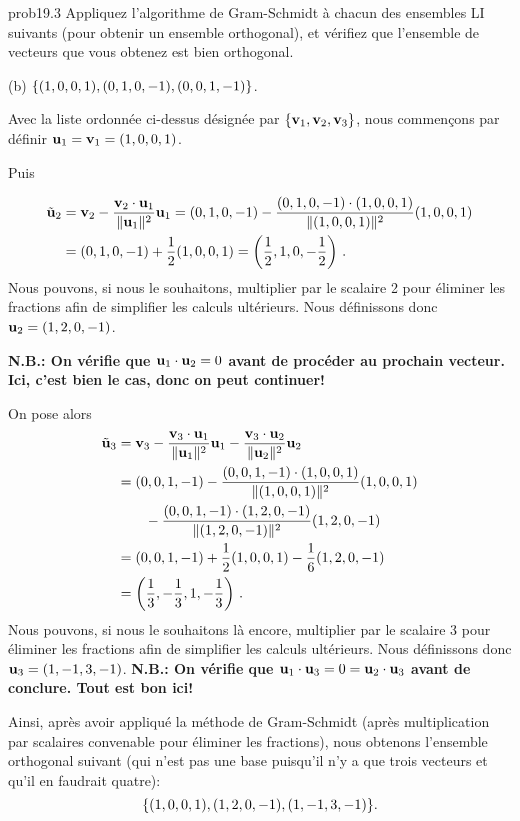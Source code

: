 \bigskip
\begin{sol}{prob19.3} Appliquez l'algorithme de Gram-Schmidt à chacun des ensembles LI suivants (pour obtenir un ensemble orthogonal), et vérifiez que l'ensemble de vecteurs que vous obtenez est bien orthogonal.
\medskip

(b) $\{(1, 0, 0, 1),(0, 1, 0, -1),(0, 0, 1, -1)\}$.

\soln Avec la liste ordonnée ci-dessus désignée par $\{\mathbf{v}_1, \mathbf{v}_2, \mathbf{v}_3\}$, nous commençons par définir $\mathbf{u}_1=\mathbf{v}_1=(1, 0, 0, 1)$. 

Puis 

\begin{align*}
\tilde {\mathbf{u}}_2&= \mathbf{v}_2 -\frac{\mathbf{v}_2\cdot \mathbf{u}_1}{\| \mathbf{u}_1\|^2}\mathbf{u}_1=(0, 1, 0, -1)-\frac{(0, 1, 0, -1)\cdot (1, 0, 0, 1)}{\| (1, 0, 0, 1)\|^2}(1, 0, 0, 1)\\
&=(0, 1, 0, -1)+\frac12 (1, 0, 0, 1)=\left(\frac12, 1,0,-\frac12\right)\,.\end{align*}
Nous pouvons, si nous le souhaitons, multiplier par le scalaire 2 pour éliminer les fractions afin de simplifier les calculs ultérieurs. Nous définissons donc $\mathbf{u}_2=(1,2,0,-1)$. 

{\bf N.B.: On v\'erifie que $\mathbf{u}_1\cdot \mathbf{u}_2=0$ avant de proc\'eder au prochain vecteur. Ici, c'est bien le cas, donc on peut continuer!}

On pose alors
\begin{align*}
 \tilde {\mathbf{u}}_3 &=\mathbf{v}_3 -\frac{\mathbf{v}_3\cdot \mathbf{u}_1}{\| \mathbf{u}_1\|^2}\mathbf{u}_1-\frac{\mathbf{v}_3\cdot \mathbf{u}_2}{\| \mathbf{u}_2\|^2}\mathbf{u}_2 \\
  &= (0, 0, 1, -1)-\frac{(0, 0, 1, -1)\cdot (1, 0, 0, 1)}{\| (1, 0, 0, 1)\|^2}(1, 0, 0, 1)\\
&\qquad-\frac{(0, 0, 1, -1)\cdot (1,2,0,-1)}{\| (1,2,0,-1)\|^2}(1,2,0,-1)\\
  &=(0, 0, 1, -1)+\frac{1}{2}(1, 0, 0, 1)-\frac16 (1,2,0,-1)\\
  &= \left(\frac13,-\frac13  , 1 ,-\frac13 \right)\,.\end{align*}
Nous pouvons, si nous le souhaitons l\`a encore, multiplier par le scalaire 3 pour éliminer les fractions afin de simplifier les calculs ultérieurs. Nous définissons donc $\mathbf{u}_3=(1,-1,3,-1)$. 
 {\bf N.B.: On v\'erifie que $\mathbf{u}_1\cdot \mathbf{u}_3=0=\mathbf{u}_2\cdot \mathbf{u}_3$ avant de conclure. Tout est bon ici!}

Ainsi, après avoir appliqué la méthode de Gram-Schmidt (apr\`es multiplication par scalaires convenable pour \'eliminer les fractions), nous obtenons l'ensemble orthogonal suivant (qui n'est pas une base puisqu'il n'y a que trois vecteurs et qu'il en faudrait quatre): 
$$\{(1, 0, 0, 1),(1,2,0,-1),(1,-1,3,-1)\}.$$
\medskip 



\end{sol}
